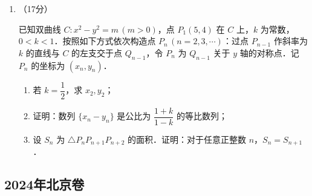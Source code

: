 \begin{description}
\begin{enumerate}[leftmargin=5pt]
        某投篮比赛分为两个阶段，每个参赛队由两名队员组成．比赛具体规则如下：第一阶段由参赛队中一名队员投篮3次，若3次都未投中，则该队被淘汰，比赛成绩为0分；若至少投中1次，则该队进入第二阶段．第二阶段由该队的另一名队员投篮3次，每次投篮投中得5分，未投中得0分．该队的比赛成绩为第二阶段的得分总和．某参赛队由甲、乙两名队员组成，设甲每次投中的概率为 $p$，乙每次投中的概率为 $q$，各次投中与否相互独立．

        \begin{enumerate}[label=(\arabic*)]
            \item 若 $p=0.4$，$q=0.5$，甲参加第一阶段比赛，求甲、乙所在队的比赛成绩不少于5分的概率；
            \item 假设 $0<p<q$．
            \begin{enumerate}[label=\textcircled{\arabic*}]
                \item 为使得甲、乙所在队的比赛成绩为15分的概率最大，应该由谁参加第一阶段比赛？
                \item 为使得甲、乙所在队的比赛成绩的数学期望最大，应该由谁参加第一阶段比赛？
            \end{enumerate}
        \end{enumerate}

        \item （17分）

        已知双曲线 $C:x^2-y^2=m\,(m>0)$，点 $P_1(5,4)$ 在 $C$ 上，$k$ 为常数，$0<k<1$．按照如下方式依次构造点 $P_n\,(n=2,3,\cdots)$：过点 $P_{n-1}$ 作斜率为 $k$ 的直线与 $C$ 的左支交于点 $Q_{n-1}$，令 $P_n$ 为 $Q_{n-1}$ 关于 $y$ 轴的对称点．记 $P_n$ 的坐标为 $(x_n,y_n)$．

        \begin{enumerate}[label=(\arabic*)]
            \item 若 $k=\dfrac{1}{2}$，求 $x_2,y_2$；
            \item 证明：数列 $\{x_n-y_n\}$ 是公比为 $\dfrac{1+k}{1-k}$ 的等比数列；
            \item 设 $S_n$ 为 $\triangle P_nP_{n+1}P_{n+2}$ 的面积．证明：对于任意正整数 $n$，$S_n=S_{n+1}$．
        \end{enumerate}
    \end{enumerate}
\end{description}
\clearpage


\subsection{2024年北京卷}\label{gk:2024年北京卷}

